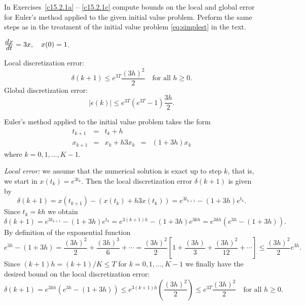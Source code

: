 \documentclass{ximera}
\begin{document}
\noindent In Exercises~\ref{c15.2.1a} -- \ref{c15.2.1c} compute
bounds on the local and global error for Euler's method applied
to the given initial value problem.  Perform the same steps as in
the treatment of the initial value problem \eqref{eq:simplest} in
the text.
\begin{exercise} \label{c15.2.1a}
$\frac{\displaystyle dx}{\displaystyle dt} = 3x,\quad x(0)=1$.

\begin{solution}
\ans Local discretization error:
\[
\delta(k+1) \le
e^{3T}\frac{(3h)^2}{2} \quad \mbox{for all $h\ge 0$.}
\]
Global discretization error:
\[
|\epsilon(k)| \le e^{3T}(e^{3T}-1)\frac{3h}{2}.
\]

\soln Euler's method applied to the initial value problem takes the form
\[
\begin{array}{rclcl}
t_{k+1} & = & t_k+h & & \\
x_{k+1} & = & x_k + h 3 x_k & = & (1+3h)x_k
\end{array}
\]
where $k=0,1,\ldots,K-1$.

{\em Local error:} we assume that the
numerical solution is exact up to step $k$, that is,
we start in $x(t_k)=e^{3t_k}$.  Then the local discretization error
$\delta(k+1)$ is given by
\[
\delta(k+1) = x(t_{k+1}) - (x(t_k) + h 3x(t_k))=
e^{3t_{k+1}} - (1+3h)e^{t_k}.
\]
Since $t_k = kh$ we obtain
\[
\delta(k+1) = e^{3t_{k+1}} - (1+3h)e^{t_k} =
e^{3(k+1)h} - (1+3h)e^{3kh} = e^{3kh}(e^{3h}-(1+3h)).
\]
By definition of the exponential function
\[
e^{3h}-(1+3h) = \frac{(3h)^2}{2}+\frac{(3h)^3}{6}+\cdots =
\frac{(3h)^2}{2}\left[ 1+\frac{(3h)}{3}+\frac{(3h)^2}{12}+\cdots\right]
\le \frac{(3h)^2}{2}e^{3h}.
\]
Since $(k+1)h=(k+1)/K\le T$ for $k=0,1,\ldots,K-1$ we finally have the
desired bound on the local discretization error:
\[
\delta(k+1) = e^{3kh}(e^{3h}-(1+3h)) \le
e^{3(k+1)h}\left(\frac{(3h)^2}{2}\right)\le
e^{3T}\frac{(3h)^2}{2} \quad \mbox{for all $h\ge 0$.}
\]


\end{solution}
\end{exercise}
\end{document}
